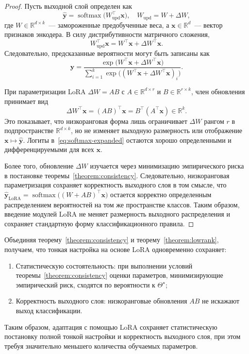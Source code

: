 \begin{proof}
Пусть выходной слой определен как
\[
    \hat{\mathbf{y}} = \operatorname{softmax}\!\big(W_{\mathrm{upd}}^{\top}\mathbf{x}\big), \quad W_{\mathrm{upd}} = W + \Delta W,
\]
где $W \in \mathbb{R}^{d\times k}$~--- замороженные предобученные веса, а $\mathbf{x}\in\mathbb{R}^d$~--- вектор признаков энкодера.
В силу дистрибутивности матричного сложения,
\[
    W_{\mathrm{upd}}^{\top}\mathbf{x} = W^{\top}\mathbf{x} + \Delta W^{\top}\mathbf{x}.
\]
Следовательно, предсказанные вероятности могут быть записаны как
\begin{equation}\label{eq:softmax-expanded}
    \hat{\mathbf{y}} = \frac{\exp\!\big(W^{\top}\mathbf{x} + \Delta W^{\top}\mathbf{x}\big)}      {\sum_{i=1}^{k}\exp\!\big((W^{\top}\mathbf{x} + \Delta W^{\top}\mathbf{x})_i\big)}.
\end{equation}

При параметризации LoRA $\Delta W = AB$ с $A\in\mathbb{R}^{d\times r}$ и $B\in\mathbb{R}^{r\times k}$, член обновления принимает вид
\[
    \Delta W^{\top}\mathbf{x} = (AB)^{\top}\mathbf{x} = B^{\top}(A^{\top}\mathbf{x}) \in \mathbb{R}^{k}.
\]
Это показывает, что низкоранговая форма лишь ограничивает $\Delta W$ рангом $r$ в подпространстве $\mathbb{R}^{d\times k}$, но не изменяет выходную размерность или отображение $\mathbf{x}\mapsto\hat{\mathbf{y}}$.
Логиты в~\eqref{eq:softmax-expanded} остаются хорошо определенными и дифференцируемыми для всех $\mathbf{x}$.

Более того, обновление $\Delta W$ изучается через минимизацию эмпирического риска в постановке теоремы~\ref{theorem:consistency}.
Следовательно, низкоранговая параметризация сохраняет корректность выходного слоя в том смысле, что~$\hat{\mathbf{y}}_{\mathrm{LoRA}} = \operatorname{softmax}\!\big((W+AB)^{\top}\mathbf{x}\big)$ остается корректно определенным распределением вероятностей на том же пространстве классов.
Таким образом, введение модулей LoRA не меняет размерность выходного распределения и сохраняет стандартную форму классификационного правила.
\end{proof}

\begin{corollary}
\label{corollary:lora}
Объединяя теорему~\ref{theorem:consistency} и теорему~\ref{theorem:lowrank}, получаем, что тонкая настройка на основе LoRA одновременно сохраняет:
\begin{enumerate}
    \item Статистическую состоятельность: при выполнении условий теоремы~\ref{theorem:consistency} оценки параметров, минимизирующие эмпирический риск, сходятся по вероятности к $\Theta^\star$;
    \item Корректность выходного слоя: низкоранговые обновления $AB$ не искажают выход классификации.
\end{enumerate}
Таким образом, адаптация с помощью LoRA сохраняет статистическую постановку полной тонкой настройки и корректность выходного слоя, при этом требуя значительно меньшего количества обучаемых параметров.
\end{corollary}

